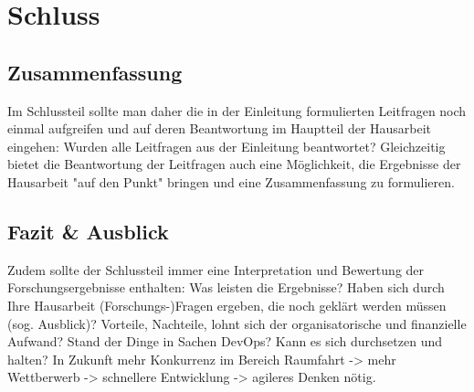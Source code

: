\chapter{Schluss} %

\section{Zusammenfassung}

Im Schlussteil sollte man daher die in der Einleitung formulierten Leitfragen noch einmal aufgreifen und auf deren Beantwortung im Hauptteil der Hausarbeit eingehen: Wurden alle Leitfragen aus der Einleitung beantwortet?
Gleichzeitig bietet die Beantwortung der Leitfragen auch eine Möglichkeit, die Ergebnisse der Hausarbeit "auf den Punkt" bringen und eine Zusammenfassung zu formulieren.

\section{Fazit \& Ausblick}

Zudem sollte der Schlussteil immer eine Interpretation und Bewertung der Forschungsergebnisse enthalten: Was leisten die Ergebnisse? Haben sich durch Ihre Hausarbeit (Forschungs-)Fragen ergeben, die noch geklärt werden müssen (sog. Ausblick)?
Vorteile, Nachteile, lohnt sich der organisatorische und finanzielle Aufwand?
Stand der Dinge in Sachen DevOps? Kann es sich durchsetzen und halten?
In Zukunft mehr Konkurrenz im Bereich Raumfahrt -> mehr Wettberwerb -> schnellere Entwicklung -> agileres Denken nötig.

